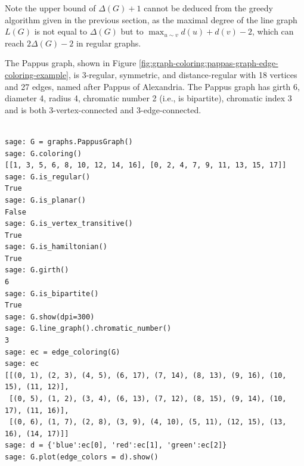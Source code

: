 Note the upper bound of $\Delta(G)+1$ 
cannot be deduced from the greedy algorithm given in the 
previous section, as the maximal degree of the line graph
$L(G)$ is not equal to 
$\Delta(G)$ but to $\displaystyle \max_{u\sim v}d(u)+d(v)-2$, which 
can reach $2\Delta(G)-2$ in regular graphs.


\begin{example}
\label{example:graph-coloring:pappas-graph-edge-coloring-example}
The Pappus graph, shown in Figure
\ref{fig:graph-coloring:pappas-graph-edge-coloring-example},
 is $3$-regular, symmetric, and distance-regular with 18 vertices and
27 edges, named after Pappus of Alexandria.
The Pappus graph has girth 6, diameter 4, radius 4, chromatic number
2 (i.e., is bipartite), 
chromatic index 3 and is both 3-vertex-connected and 3-edge-connected.

{\small{
\begin{verbatim}

sage: G = graphs.PappusGraph()
sage: G.coloring()
[[1, 3, 5, 6, 8, 10, 12, 14, 16], [0, 2, 4, 7, 9, 11, 13, 15, 17]]
sage: G.is_regular()
True
sage: G.is_planar()
False
sage: G.is_vertex_transitive()
True
sage: G.is_hamiltonian()
True
sage: G.girth()
6
sage: G.is_bipartite()
True
sage: G.show(dpi=300)
sage: G.line_graph().chromatic_number()
3
sage: ec = edge_coloring(G)
sage: ec
[[(0, 1), (2, 3), (4, 5), (6, 17), (7, 14), (8, 13), (9, 16), (10, 15), (11, 12)], 
 [(0, 5), (1, 2), (3, 4), (6, 13), (7, 12), (8, 15), (9, 14), (10, 17), (11, 16)], 
 [(0, 6), (1, 7), (2, 8), (3, 9), (4, 10), (5, 11), (12, 15), (13, 16), (14, 17)]]
sage: d = {'blue':ec[0], 'red':ec[1], 'green':ec[2]}
sage: G.plot(edge_colors = d).show()

\end{verbatim}
}}


\end{example}
